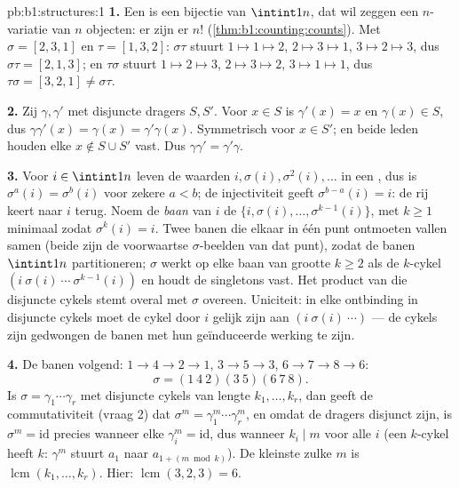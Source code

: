 \begin{solution}{pb:b1:structures:1}
\textbf{1.} Een  is een bijectie van $\intint1n$, dat wil zeggen
een $n$-variatie van $n$ objecten: er zijn er $n!$
(\cref{thm:b1:counting:counts}). Met $\sigma = [2,3,1]$ en $\tau =
[1,3,2]$: $\sigma\tau$ stuurt $1 \mapsto 1 \mapsto 2$, $2 \mapsto 3
\mapsto 1$, $3 \mapsto 2 \mapsto 3$, dus $\sigma\tau = [2,1,3]$; en
$\tau\sigma$ stuurt $1 \mapsto 2 \mapsto 3$, $2 \mapsto 3 \mapsto 2$, $3
\mapsto 1 \mapsto 1$, dus $\tau\sigma = [3,2,1] \neq \sigma\tau$.

\textbf{2.} Zij $\gamma, \gamma'$ met disjuncte dragers $S, S'$. Voor $x
\in S$ is $\gamma'(x) = x$ en $\gamma(x) \in S$, dus $\gamma\gamma'(x) =
\gamma(x) = \gamma'\gamma(x)$. Symmetrisch voor $x \in S'$; en beide leden
houden elke $x \notin S \cup S'$ vast. Dus $\gamma\gamma' =
\gamma'\gamma$.

\textbf{3.} Voor $i \in \intint1n$ leven de waarden $i, \sigma(i),
\sigma^2(i), \dots$ in een , dus is $\sigma^a(i) =
\sigma^b(i)$ voor zekere $a < b$; de injectiviteit geeft $\sigma^{b-a}(i)
= i$: de rij keert naar $i$ terug. Noem de \emph{baan} van $i$ de
 $\{i, \sigma(i), \dots, \sigma^{k-1}(i)\}$, met $k \geq 1$
minimaal zodat $\sigma^k(i) = i$. Twee banen die elkaar in één punt
ontmoeten vallen samen (beide zijn de voorwaartse $\sigma$-beelden van dat
punt), zodat de banen $\intint1n$ partitioneren; $\sigma$ werkt op elke
baan van grootte $k \geq 2$ als de $k$-cykel $(i\ \sigma(i)\ \cdots\
\sigma^{k-1}(i))$ en houdt de singletons vast. Het product van die
disjuncte cykels stemt overal met $\sigma$ overeen. Uniciteit: in elke
ontbinding in disjuncte cykels moet de cykel door $i$ gelijk zijn aan $(i\
\sigma(i)\ \cdots)$ --- de cykels zijn gedwongen de banen met hun
geïnduceerde werking te zijn.

\textbf{4.} De banen volgend: $1 \to 4 \to 2 \to 1$, $3 \to 5 \to 3$, $6
\to 7 \to 8 \to 6$:
\[
\sigma = (1\ 4\ 2)(3\ 5)(6\ 7\ 8) .
\]
Is $\sigma = \gamma_1\cdots\gamma_r$ met disjuncte cykels van lengte $k_1,
\dots, k_r$, dan geeft de commutativiteit (vraag 2) dat $\sigma^m =
\gamma_1^m\cdots\gamma_r^m$, en omdat de dragers disjunct zijn, is
$\sigma^m = \mathrm{id}$ precies wanneer elke $\gamma_i^m = \mathrm{id}$,
dus wanneer $k_i \mid m$ voor alle $i$ (een $k$-cykel heeft  $k$:
$\gamma^m$ stuurt $a_1$ naar $a_{1 + (m \bmod k)}$). De kleinste zulke $m$
is $\operatorname{lcm}(k_1, \dots, k_r)$. Hier: $\operatorname{lcm}(3, 2,
3) = 6$.


\end{solution}
